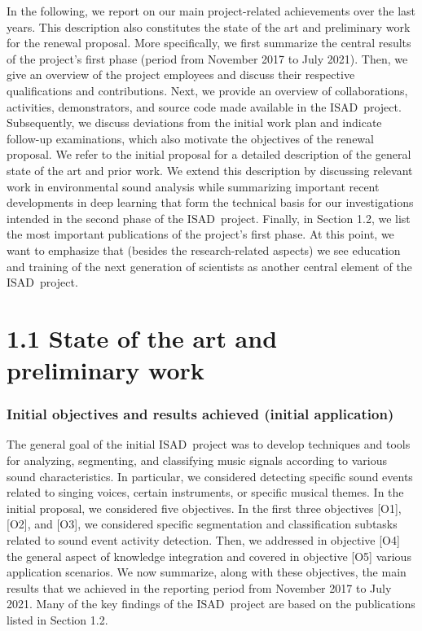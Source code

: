 \documentclass[11pt,a4paper]{article}
\def\PN{\mathrm{ISAD}}
\theoremstyle{plain} \newtheorem{define}{Definition}[section]
\begin{document}
In the following, we report on our main project-related achievements over the last years. This description also constitutes the state of the art and preliminary work for the renewal proposal. More specifically, we first summarize the central results of the project's first phase (period from November 2017 to July 2021). Then, we give an overview of the project employees and discuss their respective qualifications and contributions. Next, we provide an overview of collaborations, activities, demonstrators, and source code made available in the $\PN$~project. Subsequently, we discuss deviations from the initial work plan and indicate follow-up examinations, which also motivate the objectives of the renewal proposal.
%
We refer to the initial proposal for a detailed description of the general state of the art and prior work. We extend this description by discussing relevant work in 
environmental sound analysis while summarizing important recent developments in deep learning that form the technical basis for our investigations intended in the second phase of the $\PN$~project. Finally, in Section 1.2, we list the most important publications of the project's first phase.
%
At this point, we want to emphasize that (besides the research-related aspects) we see education and training of the next generation of scientists as another central element of the $\PN$~project.

\section*{1.1 State of the art and preliminary work}

\subsubsection*{Initial objectives and results achieved (initial application)}

The general goal of the initial $\PN$~project was to develop techniques and tools for analyzing, segmenting, and classifying music signals according to various sound characteristics. In particular, we considered detecting specific sound events related to singing voices, certain instruments, or specific musical themes. 
%
In the initial proposal, we considered five objectives. In the first three objectives [O1], [O2], and [O3], we considered specific segmentation and classification subtasks related to sound event activity detection. Then, we addressed in objective [O4] the general aspect of knowledge integration and covered in objective [O5] various application scenarios. We now summarize, along with these objectives, the main results that we achieved in the reporting period from November 2017 to July 2021. Many of the key findings of the $\PN$~project are based on the publications listed in Section 1.2.  
\end{document}
